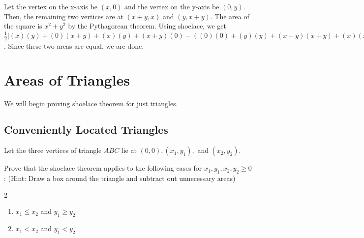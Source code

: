 \documentclass[11pt]{article}
\begin{document}
\begin{solution}
Let the vertex on the x-axis be $(x, 0)$ and the vertex on the y-axis be $(0, y)$. Then, the remaining two vertices are at $(x+y, x)$ and $(y, x+y)$. The area of the square is $x^2+y^2$ by the Pythagorean theorem. Using shoelace, we get $\frac{1}{2}|(x)(y) + (0)(x+y) + (x)(y) + (x+y)(0)- ((0)(0) + (y)(y) + (x+y)(x+y) + (x)(x))| = \frac{1}{2}|xy+xy-y^2-x^2-2xy-y^2-x^2| = x^2+y^2$. Since these two areas are equal, we are done.
\end{solution}

\section{Areas of Triangles}

\noindent We will begin proving shoelace theorem for just triangles.
\subsection{Conveniently Located Triangles}
\noindent  Let the three vertices of triangle $ABC$ lie at $(0, 0), (x_1, y_1),$  and $(x_2, y_2)$.

\phantom{hello there}

\begin{problem}  Prove that the shoelace theorem applies to the following cases for $x_1, y_1, x_2, y_2 \geq 0$: (Hint: Draw a box around the triangle and subtract out unnecessary areas)
\end{problem}
\phantom{blahbity blah} 
\begin{multicols}{2}
\begin{enumerate}[label=(\alph*)]
\item $x_1 \leq x_2$ and $y_1 \geq y_2$
    \newline
\item $x_1 < x_2$ and $y_1 < y_2$
    \newline
\end{enumerate}
\end{multicols}
\end{document}
